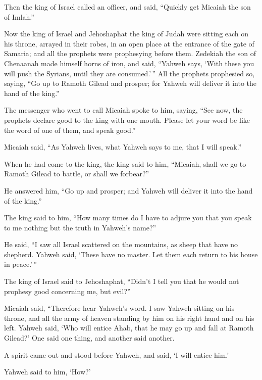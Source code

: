  Then the king of Israel called an officer, and said,
``Quickly get Micaiah the son of Imlah.''

 Now the king of Israel and Jehoshaphat the king of Judah
were sitting each on his throne, arrayed in their robes, in an open
place at the entrance of the gate of Samaria; and all the prophets were
prophesying before them.  Zedekiah the son of Chenaanah
made himself horns of iron, and said, ``Yahweh says, `With these you
will push the Syrians, until they are consumed.'\,''  All
the prophets prophesied so, saying, ``Go up to Ramoth Gilead and
prosper; for Yahweh will deliver it into the hand of the king.''

 The messenger who went to call Micaiah spoke to him,
saying, ``See now, the prophets declare good to the king with one mouth.
Please let your word be like the word of one of them, and speak good.''

 Micaiah said, ``As Yahweh lives, what Yahweh says to me,
that I will speak.''

 When he had come to the king, the king said to him,
``Micaiah, shall we go to Ramoth Gilead to battle, or shall we
forbear?''

He answered him, ``Go up and prosper; and Yahweh will deliver it into
the hand of the king.''

 The king said to him, ``How many times do I have to
adjure you that you speak to me nothing but the truth in Yahweh's
name?''

 He said, ``I saw all Israel scattered on the mountains,
as sheep that have no shepherd. Yahweh said, `These have no master. Let
them each return to his house in peace.'\,''

 The king of Israel said to Jehoshaphat, ``Didn't I tell
you that he would not prophesy good concerning me, but evil?''

 Micaiah said, ``Therefore hear Yahweh's word. I saw
Yahweh sitting on his throne, and all the army of heaven standing by him
on his right hand and on his left.  Yahweh said, `Who
will entice Ahab, that he may go up and fall at Ramoth Gilead?' One said
one thing, and another said another.

 A spirit came out and stood before Yahweh, and said, `I
will entice him.'

 Yahweh said to him, `How?'

